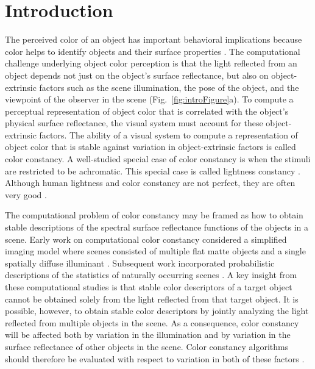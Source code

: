 \documentclass{jov}
\begin{document}
\maketitle

\section{Introduction}
The perceived color of an object has important behavioral implications because color helps to identify objects and their surface properties \cite{Mollon89, Jacobs81}.
The computational challenge underlying object color perception is that the light reflected from an object depends not just on the object's surface reflectance, but also 
on object-extrinsic factors such as the scene illumination, the pose of the object, and the viewpoint of the observer in the scene (Fig.~\ref{fig:introFigure}a).
To compute a perceptual representation of object color that is correlated with the object's physical surface reflectance, the visual system must account for these object-extrinsic factors.
The ability of a visual system to compute a representation of object color that is stable against variation in object-extrinsic factors is called color constancy. 
A well-studied special case of color constancy is when the stimuli are restricted to be achromatic. 
This special case is called lightness constancy \cite{gilchrist2006seeing}. 
Although human lightness and color constancy are not perfect, they are often very good \cite{FosterColorConstancy, BrainardColorConstancy,adelson2000,kingdom2011lightness}. 

The computational problem of color constancy may be framed as how to obtain stable descriptions of the spectral surface reflectance functions of the objects in a scene.
Early work on computational color constancy considered a simplified imaging model where scenes consisted of multiple flat matte objects and a single spatially diffuse illuminant \cite{LandRetinex,Buchsbaum80,MaloneyWandell86}.
Subsequent work incorporated probabilistic descriptions of the statistics of naturally occurring scenes \cite{D'ZmuraConstancy3, D'ZmuraIversonSinger,BrainardFreeman}.
A key insight from these computational studies is that stable color descriptors of a target object cannot be obtained solely from the light reflected from that target object.
It is possible, however, to obtain stable color descriptors by jointly analyzing the light reflected from multiple objects in the scene.
As a consequence, color constancy will be affected both by variation in the illumination and by variation in the surface reflectance of other objects in the scene.  Color constancy algorithms should therefore be evaluated with respect to variation in both of these factors \cite{brainard1986analysis,BrainardFreeman}. 
\end{document}
